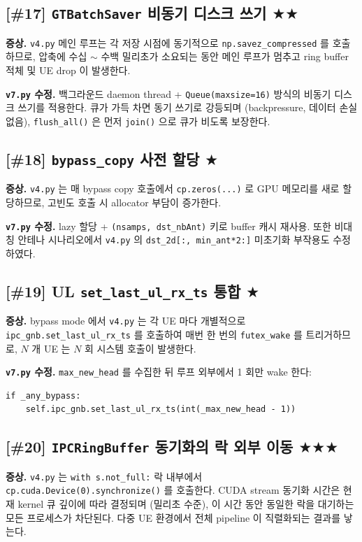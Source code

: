 \documentclass[11pt,a4paper]{article}
\newcommand{\sone}{\textcolor{starcolor}{$\bigstar$}}
\newcommand{\stwo}{\textcolor{starcolor}{$\bigstar\bigstar$}}
\newcommand{\sthree}{\textcolor{starcolor}{$\bigstar\bigstar\bigstar$}}
\newcommand{\vfour}{\texttt{v4.py}}
\newcommand{\vseven}{\texttt{v7.py}}
\newcommand{\bugitem}[3]{%
  \subsection{[\##1] #2 \hfill #3}%
  \vspace{-0.5em}%
}
\begin{document}
\bugitem{17}{\texttt{GTBatchSaver} 비동기 디스크 쓰기}{\stwo}

\textbf{증상.} \vfour{} 메인 루프는 각 저장 시점에 동기적으로
\texttt{np.savez\_compressed} 를 호출하므로, 압축에 수십 $\sim$ 수백
밀리초가 소요되는 동안 메인 루프가 멈추고 ring buffer 적체 및 UE drop 이
발생한다.

\textbf{\vseven{} 수정.} 백그라운드 daemon thread + \texttt{Queue(maxsize=16)}
방식의 비동기 디스크 쓰기를 적용한다. 큐가 가득 차면 동기 쓰기로 강등되며
(backpressure, 데이터 손실 없음), \texttt{flush\_all()} 은 먼저
\texttt{join()} 으로 큐가 비도록 보장한다.

\bugitem{18}{\texttt{bypass\_copy} 사전 할당}{\sone}

\textbf{증상.} \vfour{} 는 매 bypass copy 호출에서 \texttt{cp.zeros(...)}
로 GPU 메모리를 새로 할당하므로, 고빈도 호출 시 allocator 부담이 증가한다.

\textbf{\vseven{} 수정.} lazy 할당 + \texttt{(nsamps, dst\_nbAnt)} 키로
buffer 캐시 재사용. 또한 비대칭 안테나 시나리오에서 \vfour{} 의
\texttt{dst\_2d[:, min\_ant*2:]} 미초기화 부작용도 수정하였다.

\bugitem{19}{UL \texttt{set\_last\_ul\_rx\_ts} 통합}{\sone}

\textbf{증상.} bypass mode 에서 \vfour{} 는 각 UE 마다 개별적으로
\texttt{ipc\_gnb.set\_last\_ul\_rx\_ts} 를 호출하여 매번 한 번의
\texttt{futex\_wake} 를 트리거하므로, $N$ 개 UE 는 $N$ 회 시스템 호출이
발생한다.

\textbf{\vseven{} 수정.} \texttt{max\_new\_head} 를 수집한 뒤 루프 외부에서
1 회만 wake 한다:
\begin{verbatim}
if _any_bypass:
    self.ipc_gnb.set_last_ul_rx_ts(int(_max_new_head - 1))
\end{verbatim}

\bugitem{20}{\texttt{IPCRingBuffer} 동기화의 락 외부 이동}{\sthree}

\textbf{증상.} \vfour{} 는 \texttt{with s.not\_full:} 락 내부에서
\texttt{cp.cuda.Device(0).synchronize()} 를 호출한다. CUDA stream 동기화
시간은 현재 kernel 큐 깊이에 따라 결정되며 (밀리초 수준),
이 시간 동안 동일한 락을 대기하는 모든 프로세스가 차단된다. 다중 UE
환경에서 전체 pipeline 이 직렬화되는 결과를 낳는다.
\end{document}
